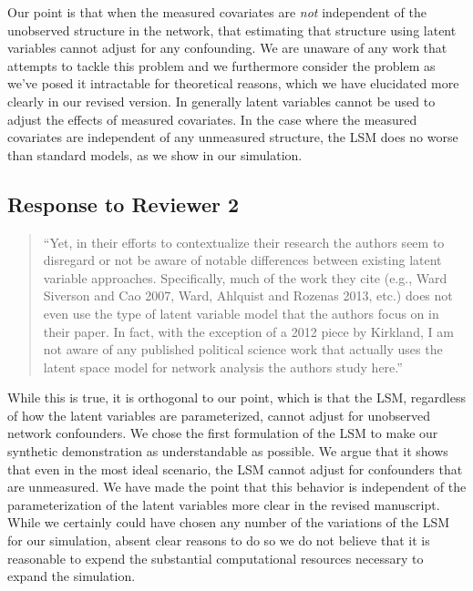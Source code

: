 Our point is that when the measured covariates are \emph{not}
independent of the unobserved structure in the network, that estimating
that structure using latent variables cannot adjust for any confounding.
We are unaware of any work that attempts to tackle this problem and we
furthermore consider the problem as we've posed it intractable for
theoretical reasons, which we have elucidated more clearly in our
revised version. In generally latent variables cannot be used to adjust
the effects of measured covariates. In the case where the measured
covariates are independent of any unmeasured structure, the LSM does no
worse than standard models, as we show in our simulation.

\subsection{Response to Reviewer 2}\label{response-to-reviewer-2}

\begin{quote}
``Yet, in their efforts to contextualize their research the authors seem
to disregard or not be aware of notable differences between existing
latent variable approaches. Specifically, much of the work they cite
(e.g., Ward Siverson and Cao 2007, Ward, Ahlquist and Rozenas 2013,
etc.) does not even use the type of latent variable model that the
authors focus on in their paper. In fact, with the exception of a 2012
piece by Kirkland, I am not aware of any published political science
work that actually uses the latent space model for network analysis the
authors study here.''
\end{quote}

While this is true, it is orthogonal to our point, which is that the
LSM, regardless of how the latent variables are parameterized, cannot
adjust for unobserved network confounders. We chose the first
formulation of the LSM to make our synthetic demonstration as
understandable as possible. We argue that it shows that even in the most
ideal scenario, the LSM cannot adjust for confounders that are
unmeasured. We have made the point that this behavior is independent of
the parameterization of the latent variables more clear in the revised
manuscript. While we certainly could have chosen any number of the
variations of the LSM for our simulation, absent clear reasons to do so
we do not believe that it is reasonable to expend the substantial
computational resources necessary to expand the simulation.

